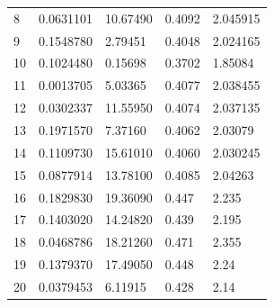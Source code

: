 \documentclass[conference]{IEEEtran}
\begin{document}
\begin{table}[ht]
\begin{tabular}{|l|ll|ll|}
8                            & 0.0631101                                   & 10.67490               & 0.4092                                     & 2.045915                        \\
9                            & 0.1548780                                   & 2.79451                & 0.4048                                     & 2.024165                        \\
10                           & 0.1024480                                   & 0.15698                & 0.3702                                     & 1.85084                         \\
11                           & 0.0013705                                   & 5.03365                & 0.4077                                     & 2.038455                        \\
12                           & 0.0302337                                   & 11.55950               & 0.4074                                     & 2.037135                        \\
13                           & 0.1971570                                   & 7.37160                & 0.4062                                     & 2.03079                         \\
14                           & 0.1109730                                   & 15.61010               & 0.4060                                     & 2.030245                        \\
15                           & 0.0877914                                   & 13.78100               & 0.4085                                     & 2.04263                         \\
16                           & 0.1829830                                   & 19.36090               & 0.447                                      & 2.235                           \\
17                           & 0.1403020                                   & 14.24820               & 0.439                                      & 2.195                           \\
18                           & 0.0468786                                   & 18.21260               & 0.471                                      & 2.355                           \\
19                           & 0.1379370                                   & 17.49050               & 0.448                                      & 2.24                            \\
20                           & 0.0379453                                   & 6.11915                & 0.428                                      & 2.14                            \\ \hline
\end{tabular}
\label{tab: raw_data}
\end{table}
\end{document}
